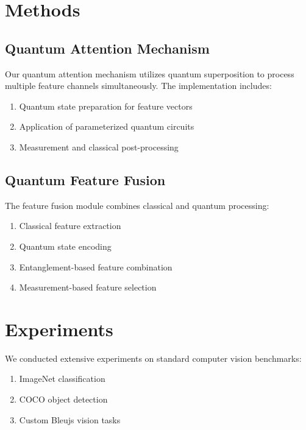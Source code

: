 \documentclass{article}
\begin{document}
\section{Methods}\label{methods}

\subsection{Quantum Attention
Mechanism}\label{quantum-attention-mechanism}

Our quantum attention mechanism utilizes quantum superposition to
process multiple feature channels simultaneously. The implementation
includes:

\begin{enumerate}
\def\labelenumi{\arabic{enumi}.}
\tightlist
\item
  Quantum state preparation for feature vectors
\item
  Application of parameterized quantum circuits
\item
  Measurement and classical post-processing
\end{enumerate}

\subsection{Quantum Feature Fusion}\label{quantum-feature-fusion}

The feature fusion module combines classical and quantum processing:

\begin{enumerate}
\def\labelenumi{\arabic{enumi}.}
\tightlist
\item
  Classical feature extraction
\item
  Quantum state encoding
\item
  Entanglement-based feature combination
\item
  Measurement-based feature selection
\end{enumerate}

\section{Experiments}\label{experiments}

We conducted extensive experiments on standard computer vision
benchmarks:

\begin{enumerate}
\def\labelenumi{\arabic{enumi}.}
\tightlist
\item
  ImageNet classification
\item
  COCO object detection
\item
  Custom Bleujs vision tasks
\end{enumerate}
\end{document}
